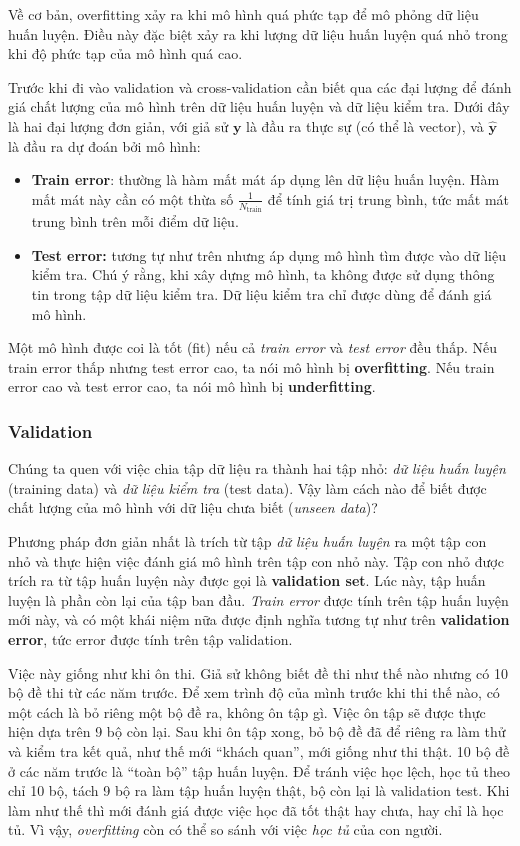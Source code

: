 \documentclass[../main-report.tex]{subfiles}
\begin{document}
Về cơ bản, overfitting xảy ra khi mô hình quá phức tạp để mô phỏng dữ liệu huấn luyện. Điều này đặc biệt xảy ra khi lượng dữ liệu huấn luyện quá nhỏ trong khi độ phức tạp của mô hình quá cao.

Trước khi đi vào validation và cross-validation cần biết qua các đại lượng để đánh giá chất lượng của mô hình trên dữ liệu huấn luyện và dữ liệu kiểm tra. Dưới đây là hai đại lượng đơn giản, với giả sử \(\mathbf{y}\) là đầu ra thực sự (có thể là vector), và \(\mathbf{\hat{y}}\) là đầu ra dự đoán bởi mô hình:

\begin{itemize}
\item \textbf{Train error}: thường là hàm mất mát áp dụng lên dữ liệu huấn luyện. Hàm mất mát này cần có một thừa số \(\frac{1}{N_{\text{train}}} \) để tính giá trị trung bình, tức mất mát trung bình trên mỗi điểm dữ liệu.
\item \textbf{Test error:} tương tự như trên nhưng áp dụng mô hình tìm được vào dữ liệu kiểm tra. Chú ý rằng, khi xây dựng mô hình, ta không được sử dụng thông tin trong tập dữ liệu kiểm tra. Dữ liệu kiểm tra chỉ được dùng để đánh giá mô hình.
\end{itemize}

Một mô hình được coi là tốt (fit) nếu cả \emph{train error} và \emph{test error} đều thấp. Nếu train error thấp nhưng test error cao, ta nói mô hình bị \textbf{overfitting}. Nếu train error cao và test error cao, ta nói mô hình bị \textbf{underfitting}.

\subsubsection*{Validation}
Chúng ta quen với việc chia tập dữ liệu ra thành hai tập nhỏ: \emph{dữ liệu huấn luyện} (training data) và \emph{dữ liệu kiểm tra} (test data). Vậy làm cách nào để biết được chất lượng của mô hình với dữ liệu chưa biết (\emph{unseen data})?

Phương pháp đơn giản nhất là trích từ tập \emph{dữ liệu huấn luyện} ra một tập con nhỏ và thực hiện việc đánh giá mô hình trên tập con nhỏ này. Tập con nhỏ được trích ra từ tập huấn luyện này được gọi là \textbf{validation set}. Lúc này, tập huấn luyện là phần còn lại của tập ban đầu. \emph{Train error} được tính trên tập huấn luyện mới này, và có một khái niệm nữa được định nghĩa tương tự như trên \textbf{validation error}, tức error được tính trên tập validation.

Việc này giống như khi ôn thi. Giả sử không biết đề thi như thế nào nhưng có 10 bộ đề thi từ các năm trước. Để xem trình độ của mình trước khi thi thế nào, có một cách là bỏ riêng một bộ đề ra, không ôn tập gì. Việc ôn tập sẽ được thực hiện dựa trên 9 bộ còn lại. Sau khi ôn tập xong, bỏ bộ đề đã để riêng ra làm thử và kiểm tra kết quả, như thế mới ``khách quan'', mới giống như thi thật. 10 bộ đề ở các năm trước là ``toàn bộ'' tập huấn luyện. Để tránh việc học lệch, học tủ theo chỉ 10 bộ, tách 9 bộ ra làm tập huấn luyện thật, bộ còn lại là validation test. Khi làm như thế thì mới đánh giá được việc học đã tốt thật hay chưa, hay chỉ là học tủ. Vì vậy, \emph{overfitting} còn có thể so sánh với việc \emph{học tủ} của con người.
\end{document}
